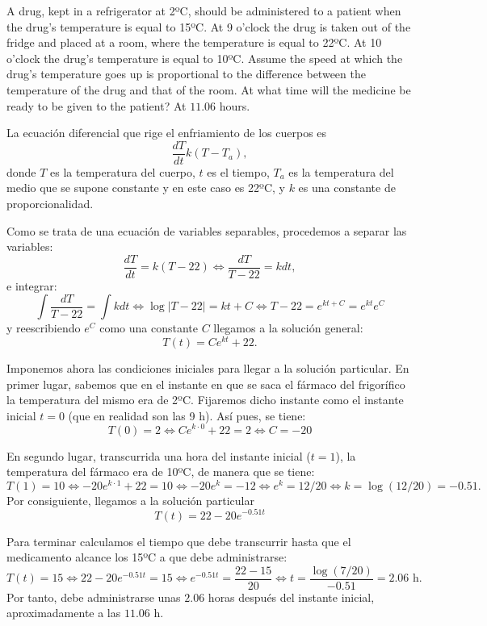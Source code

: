 {A drug, kept in a refrigerator at 2ºC, should be administered to a patient when the drug's temperature is equal to 15ºC.
At 9 o'clock the drug is taken out of the fridge and placed at a room, where the
temperature is equal to 22ºC.
At 10 o'clock the drug's temperature is equal to 10ºC.
Assume the speed at which the drug's temperature goes up is proportional to the difference between the temperature of the drug and that of the room.
At what time will the medicine be ready to be given to the patient?}
{At $11.06$ hours.
}
{La ecuación diferencial que rige el enfriamiento de los cuerpos es
\[
\frac{dT}{dt}k(T-T_a),
\]
donde $T$ es la temperatura del cuerpo, $t$ es el tiempo, $T_a$ es la
temperatura del medio que se supone constante y en este caso es 22ºC, y $k$ es
una constante de proporcionalidad.

Como se trata de una ecuación de variables separables, procedemos a separar las
variables:
\[
\frac{dT}{dt}=k(T-22) \Leftrightarrow \frac{dT}{T-22}=kdt,
\]
e integrar:
\[
\int \frac{dT}{T-22}=\int kdt \Leftrightarrow \log|T-22|=kt+C \Leftrightarrow
T-22 = e^{kt+C}=e^{kt}e^C
\]
y reescribiendo $e^C$ como una constante $C$ llegamos a la solución general:
\[T(t)=Ce^{kt}+22.\]

Imponemos ahora las condiciones iniciales para llegar a la solución particular.
En primer lugar, sabemos que en el instante en que se saca el fármaco
del frigorífico la temperatura del mismo era de 2ºC. Fijaremos dicho instante
como el instante inicial $t=0$ (que en realidad son las 9 h). Así pues, se
tiene:
\[
T(0)=2 \Leftrightarrow Ce^{k\cdot 0}+22 = 2 \Leftrightarrow C = -20
\]

En segundo lugar, transcurrida una hora del instante inicial ($t=1$), la
temperatura del fármaco era de 10ºC, de manera que se tiene:
\[
T(1)=10 \Leftrightarrow -20e^{k\cdot 1}+22 =10 \Leftrightarrow -20e^k = -12
\Leftrightarrow e^k = 12/20 \Leftrightarrow k=\log (12/20)=-0.51.
\]
Por consiguiente, llegamos a la solución particular
\[
T(t)= 22-20e^{-0.51t}
\]

Para terminar calculamos el tiempo que debe transcurrir hasta que el medicamento
alcance los 15ºC a que debe administrarse:
\[
T(t)=15 \Leftrightarrow 22-20e^{-0.51t}=15 \Leftrightarrow
e^{-0.51t}=\frac{22-15}{20} \Leftrightarrow t=\frac{\log(7/20)}{-0.51}=2.06
\mbox{ h}.
\]
Por tanto, debe administrarse unas $2.06$ horas después del instante inicial,
aproximadamente a las $11.06$ h.
}



